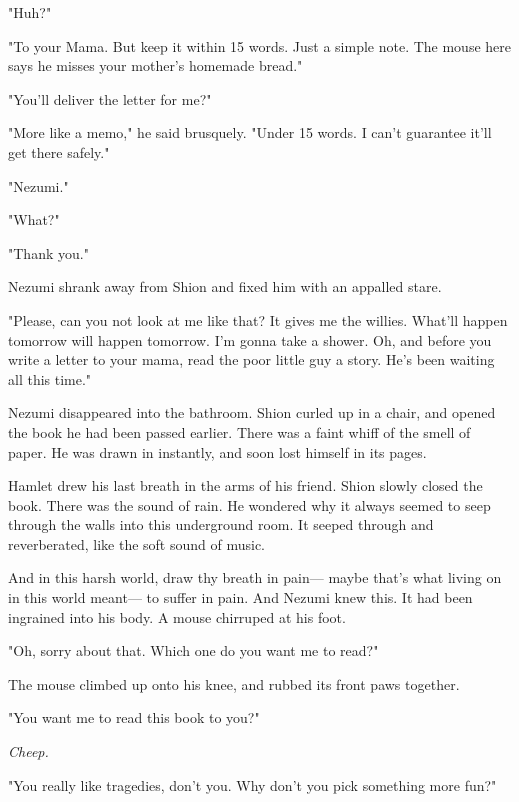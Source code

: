 "Huh?"

"To your Mama. But keep it within 15 words. Just a simple note. The
mouse here says he misses your mother's homemade bread."

"You'll deliver the letter for me?"

"More like a memo," he said brusquely. "Under 15 words. I can't
guarantee it'll get there safely."

"Nezumi."

"What?"

"Thank you."

Nezumi shrank away from Shion and fixed him with an appalled stare.

"Please, can you not look at me like that? It gives me the willies.
What'll happen tomorrow will happen tomorrow. I'm gonna take a shower.
Oh, and before you write a letter to your mama, read the poor little guy
a story. He's been waiting all this time."

Nezumi disappeared into the bathroom. Shion curled up in a chair, and
opened the book he had been passed earlier. There was a faint whiff of
the smell of paper. He was drawn in instantly, and soon lost himself in
its pages.


Hamlet drew his last breath in the arms of his friend. Shion slowly
closed the book. There was the sound of rain. He wondered why it always
seemed to seep through the walls into this underground room. It seeped
through and reverberated, like the soft sound of music.

And in this harsh world, draw thy breath in pain--- maybe that's what
living on in this world meant--- to suffer in pain. And Nezumi knew this.
It had been ingrained into his body. A mouse chirruped at his foot.

"Oh, sorry about that. Which one do you want me to read?"

The mouse climbed up onto his knee, and rubbed its front paws together.

"You want me to read this book to you?"

\emph{Cheep.}

"You really like tragedies, don't you. Why don't you pick something more
fun?"

